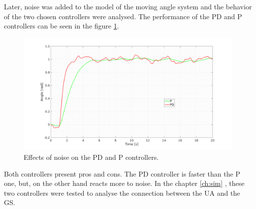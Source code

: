 Later, noise was added to the model of the moving angle system and the behavior of the two chosen controllers were analysed. The performance of the PD and P controllers can be seen in the figure \ref{fig:noise_PID}.

\begin{figure}[H]
\centerline{
\includegraphics[scale=0.35]{figures/PD_noise.png}}
\caption{Effects of noise on the PD and P controllers.}
\label{fig:noise_PID}
\end{figure}

Both controllers present pros and cons. The PD controller is faster than the P one, but, on the other hand reacts more to noise. In the chapter \ref{ch:sim} , these two controllers were tested to analyse the connection between the UA and the GS.